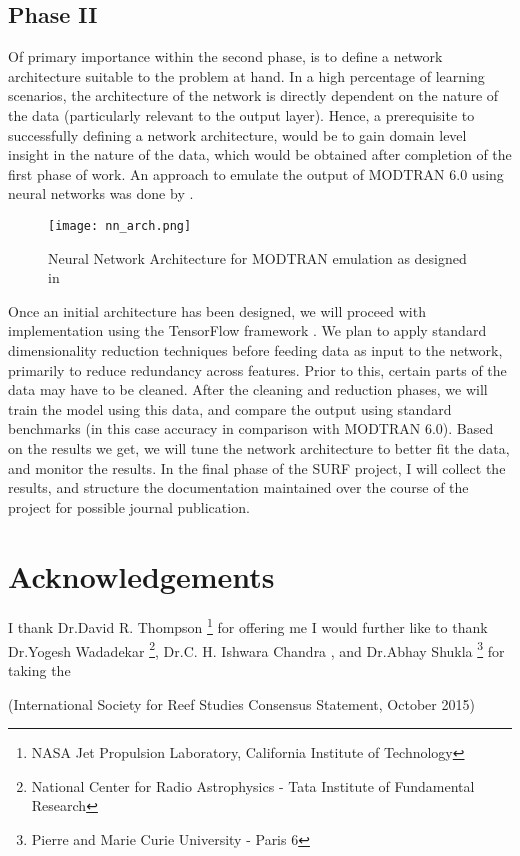 \documentclass{article}
\begin{document}
\begin{multicols*}{2}
\subsection{Phase II}
Of primary importance within the second phase, is to define a network architecture suitable to the problem at hand. In a high percentage of learning scenarios, the architecture of the network is directly dependent on the nature of the data (particularly relevant to the output layer). Hence, a prerequisite to successfully defining a network architecture, would be to gain domain level insight in the nature of the data, which would be obtained after completion of the first phase of work.
An approach to emulate the output of MODTRAN 6.0 using neural networks was done by \cite{DRT-NN}.
\begin{figure}[H]
\centering
\texttt{[image: nn\_arch.png]}
\caption{Neural Network Architecture for MODTRAN emulation as designed in \cite{DRT-NN}}
\end{figure}
Once an initial architecture has been designed, we will proceed with implementation using the TensorFlow framework \cite{TensorFlow}. We plan to apply standard dimensionality reduction techniques before feeding data as input to the network, primarily to reduce redundancy across features. Prior to this, certain parts of the data may have to be cleaned. After the cleaning and reduction phases, we will train the model using this data, and compare the output using standard benchmarks (in this case accuracy in comparison with MODTRAN 6.0). Based on the results we get, we will tune the network architecture to better fit the data, and monitor the results.
In the final phase of the SURF project, I will collect the results, and structure the documentation maintained over the course of the project for possible journal publication.

\section*{Acknowledgements}
I thank Dr.David R. Thompson \footnote{NASA Jet Propulsion Laboratory, California Institute of Technology} for offering me 
I would further like to thank Dr.Yogesh Wadadekar \footnote{\label{NCRA-TIFR} National Center for Radio Astrophysics - Tata Institute of Fundamental Research}, Dr.C. H. Ishwara Chandra \footnotemark[\ref{NCRA-TIFR}], and Dr.Abhay Shukla \footnote{Pierre and Marie Curie University - Paris 6} for taking the 

\begin{thebibliography}{10}
(International Society for Reef Studies Consensus Statement, October 2015)


\end{thebibliography}
\end{multicols*}
\end{document}
